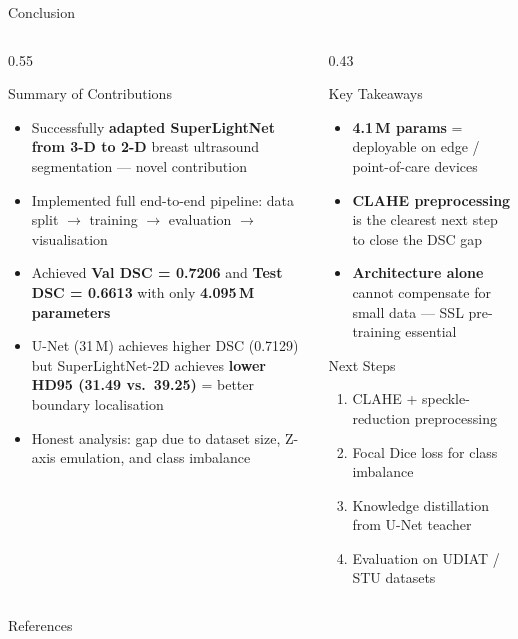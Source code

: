 \documentclass[aspectratio=169,10pt]{beamer}
\begin{document}
\begin{frame}{Conclusion}
  \begin{columns}[T]
    \begin{column}{0.55\textwidth}
      \begin{block}{Summary of Contributions}
        \begin{itemize}
          \item Successfully \textbf{adapted SuperLightNet from 3-D to 2-D}
                breast ultrasound segmentation --- novel contribution
          \item Implemented full end-to-end pipeline: data split $\to$
                training $\to$ evaluation $\to$ visualisation
          \item Achieved \textbf{Val DSC = 0.7206} and
                \textbf{Test DSC = 0.6613} with only \textbf{4.095\,M parameters}
          \item U-Net (31\,M) achieves higher DSC (0.7129) but SuperLightNet-2D
                achieves \textbf{lower HD95 (31.49 vs.\ 39.25)} = better boundary localisation
          \item Honest analysis: gap due to dataset size, Z-axis emulation,
                and class imbalance
        \end{itemize}
      \end{block}
    \end{column}
    \begin{column}{0.43\textwidth}
      \begin{alertblock}{Key Takeaways}
        \begin{itemize}
          \item \textbf{4.1\,M params} = deployable on edge / point-of-care devices
          \item \textbf{CLAHE preprocessing} is the clearest next step to close the DSC gap
          \item \textbf{Architecture alone} cannot compensate for small data --- SSL pre-training essential
        \end{itemize}
      \end{alertblock}
      \vspace{6pt}
      \begin{block}{Next Steps}
        \begin{enumerate}
          \item CLAHE + speckle-reduction preprocessing
          \item Focal Dice loss for class imbalance
          \item Knowledge distillation from U-Net teacher
          \item Evaluation on UDIAT / STU datasets
        \end{enumerate}
      \end{block}
    \end{column}
  \end{columns}
\end{frame}

\begin{frame}[allowframebreaks]{References}
  \printbibliography[heading=none]
\end{frame}
\end{document}
